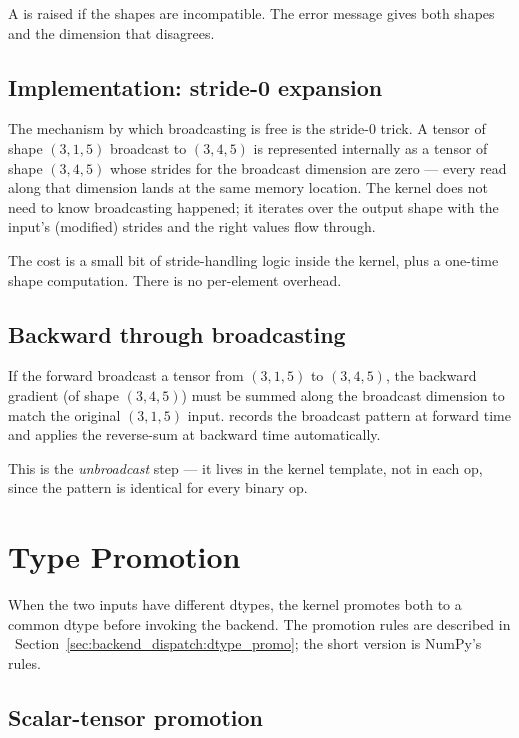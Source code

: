 A  is raised if the shapes are incompatible. The
error message gives both shapes and the dimension that
disagrees.

\subsection{Implementation: stride-0 expansion}
\label{ssec:binary_functions:stride_zero}

The mechanism by which broadcasting is free is the stride-0
trick. A tensor of shape \((3, 1, 5)\) broadcast to \((3, 4, 5)\)
is represented internally as a tensor of shape \((3, 4, 5)\) whose
strides for the broadcast dimension are zero --- every read along
that dimension lands at the same memory location. The kernel does
not need to know broadcasting happened; it iterates over the
output shape with the input's (modified) strides and the right
values flow through.

The cost is a small bit of stride-handling logic inside the kernel,
plus a one-time shape computation. There is no per-element overhead.

\subsection{Backward through broadcasting}
\label{ssec:binary_functions:broadcast_back}

If the forward broadcast a tensor from \((3, 1, 5)\) to \((3, 4,
5)\), the backward gradient (of shape \((3, 4, 5)\)) must be summed
along the broadcast dimension to match the original \((3, 1, 5)\)
input.  records the broadcast pattern at
forward time and applies the reverse-sum at backward time
automatically.

This is the \emph{unbroadcast} step --- it lives in the kernel
template, not in each op, since the pattern is identical for every
binary op.

\section{Type Promotion}
\label{sec:binary_functions:promotion}

When the two inputs have different dtypes, the kernel promotes
both to a common dtype before invoking the backend. The promotion
rules are described in
~Section~\ref{sec:backend_dispatch:dtype_promo};
the short version is NumPy's rules.

\subsection{Scalar-tensor promotion}
\label{ssec:binary_functions:scalar_promo}

